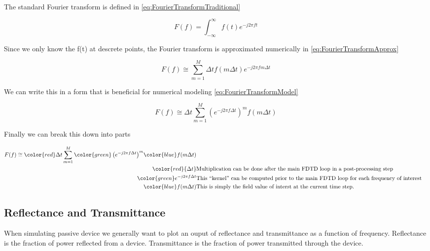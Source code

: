 \documentclass[a4paper,10pt]{article}
\begin{document}
The standard Fourier transform is defined in \eqref{eq:FourierTransformTraditional}

\begin{equation}
 \label{eq:FourierTransformTraditional}
 F(f) = \int_{-\infty}^{\infty}f(t)e^{-j2 \pi ft}
\end{equation}

Since we only know the f(t) at descrete points, the Fourier transform is approximated numerically in \eqref{eq:FourierTransformApprox}

\begin{equation}
 \label{eq:FourierTransformApprox}
  F(f) \cong  \sum_{m=1}^{M}\Delta tf(m\Delta t)e^{-j2\pi fm\Delta t}
\end{equation}

We can write this in a form that is beneficial for numerical modeling \eqref{eq:FourierTransformModel}

\begin{equation}
  \label{eq:FourierTransformModel}
  F(f) \cong \Delta t \sum_{m=1}^{M}\left(e^{-j2\pi f\Delta t}\right)^{m}f(m\Delta t)
\end{equation}

Finally we can break this down into parts


\begin{eqnarray}
 F(f) \cong {\color{red}\Delta t} \sum_{m=1}^{M}{\color{green}\left(e^{-j2\pi f\Delta t}\right)}^{m}{\color{blue}f(m\Delta t)}\\
 \color{red}{\Delta t} & \mbox{Multiplication can be done after the main FDTD loop in a post-processing step}\\
 \color{green}e^{-j2\pi f\Delta t} & \mbox{This ``kernel'' can be computed prior to the main FDTD loop for each frequency of interest}\\
 \color{blue}f(m\Delta t) & \mbox{This is simply the field value of interst at the current time step.}
\end{eqnarray}

\subsection{Reflectance and Transmittance}

When simulating passive device we generally want to plot an ouput of reflectance and transmittance as a function of frequency.  Reflectance is the fraction of power reflected from a device.  Transmittance is the fraction of power transmitted through the device.
\end{document}
